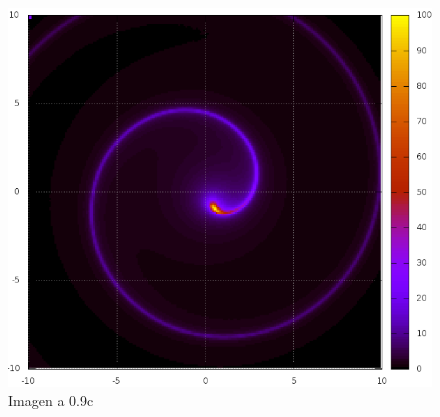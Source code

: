 \documentclass{article}
\begin{document}
\begin{figure}[h]
\centering
	\includegraphics[scale=0.5]{Circulo09c.png}
	\caption{Imagen a 0.9c}
	\label{Fi: Galaxia}
\end{figure}
\end{document}
